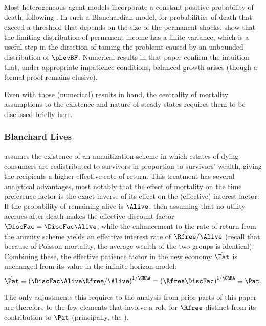 \documentclass[BufferStockTheory]{subfiles}
\begin{document}
Most heterogeneous-agent models incorporate a constant positive probability of death, following \cite{blanchardFinite}.  In such a Blanchardian model, for probabilities of death that exceed a threshold that depends on the size of the permanent shocks, \cite{cstwMPC} show that the limiting distribution of permanent income has a finite variance, which is a useful step in the direction of taming the problems caused by an unbounded distribution of $\pLevBF$.  Numerical results in that paper confirm the intuition that, under appropriate impatience conditions, balanced growth arises (though a formal proof remains elusive).

Even with those (numerical) results in hand, the centrality of mortality assumptions to the existence and nature of steady states requires them to be discussed briefly here.

\hypertarget{Blanchard-Lives}{}
\subsubsection{Blanchard Lives}

\cite{blanchardFinite} assumes the existence of an annuitization scheme in which estates of dying consumers are redistributed to survivors in proportion to survivors' wealth, giving the recipients a higher effective rate of return. This treatment has several analytical advantages, most notably that the effect of mortality on the time preference factor is the exact inverse of its effect on the (effective) interest factor:  If the probability of remaining alive is $\Alive$, then assuming that no utility accrues after death makes the effective discount factor $\hat{\DiscFac}=\DiscFac\Alive$, while the enhancement to the rate of return from the annuity scheme yields an effective interest rate of $\hat{\Rfree}/\Alive$ (recall that because of Poisson mortality, the average wealth of the two groups is identical).  Combining these, the effective patience factor in the new economy $\hat{\Pat}$ is unchanged from its value in the infinite horizon model:
\begin{equation}
  \hat{\Pat} \equiv \left(\DiscFac \Alive \Rfree / \Alive\right)^{1/\CRRA} = \left(\Rfree \DiscFac\right)^{1/\CRRA} \equiv \Pat.
\end{equation}

The only adjustments this requires to the analysis from prior parts of this paper are therefore to the few elements that involve a role for $\Rfree$ distinct from its contribution to $\Pat$ (principally, the {\RIC}).  %
\end{document}
